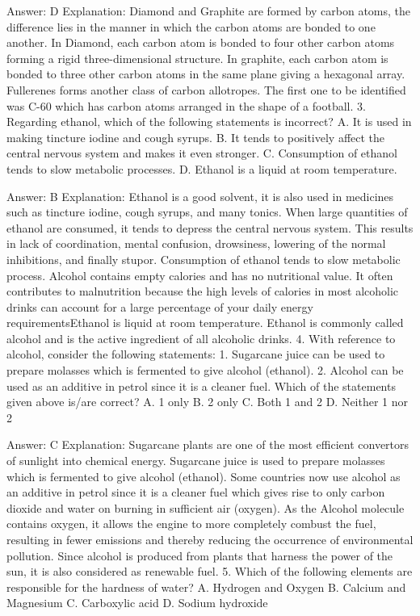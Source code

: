 Answer: D
Explanation: Diamond and Graphite are formed by carbon atoms, the difference lies in the manner in which the carbon atoms are bonded to one another. In Diamond, each carbon atom is bonded to four other carbon atoms forming a rigid three-dimensional structure. In graphite, each carbon atom is bonded to three other carbon atoms in the same plane giving a hexagonal array. Fullerenes forms another class of carbon allotropes. The first one to be identified was C-60 which has carbon atoms arranged in the shape of a football. 3. Regarding ethanol, which of the following statements is incorrect? A. It is used in making tincture iodine and cough syrups. B. It tends to positively affect the central nervous system and makes it even stronger. C. Consumption of ethanol tends to slow metabolic processes. D. Ethanol is a liquid at room temperature. 

Answer: B
Explanation: Ethanol is a good solvent, it is also used in medicines such as tincture iodine, cough syrups, and many tonics. When large quantities of ethanol are consumed, it tends to depress the central nervous system. This results in lack of coordination, mental confusion, drowsiness, lowering of the normal inhibitions, and finally stupor. Consumption of ethanol tends to slow metabolic process. Alcohol contains empty calories and has no nutritional value. It often contributes to malnutrition because the high levels of calories in most alcoholic drinks can account for a large percentage of your daily energy requirementsEthanol is liquid at room temperature. Ethanol is commonly called alcohol and is the active ingredient of all alcoholic drinks. 4. With reference to alcohol, consider the following statements: 1. Sugarcane juice can be used to prepare molasses which is fermented to give alcohol (ethanol). 2. Alcohol can be used as an additive in petrol since it is a cleaner fuel. Which of the statements given above is/are correct? A. 1 only B. 2 only C. Both 1 and 2 D. Neither 1 nor 2 

Answer: C
Explanation: Sugarcane plants are one of the most efficient convertors of sunlight into chemical energy. Sugarcane juice is used to prepare molasses which is fermented to give alcohol (ethanol). Some countries now use alcohol as an additive in petrol since it is a cleaner fuel which gives rise to only carbon dioxide and water on burning in sufficient air (oxygen). As the Alcohol molecule contains oxygen, it allows the engine to more completely combust the fuel, resulting in fewer emissions and thereby reducing the occurrence of environmental pollution. Since alcohol is produced from plants that harness the power of the sun, it is also considered as renewable fuel. 5. Which of the following elements are responsible for the hardness of water? A. Hydrogen and Oxygen B. Calcium and Magnesium C. Carboxylic acid D. Sodium hydroxide 

